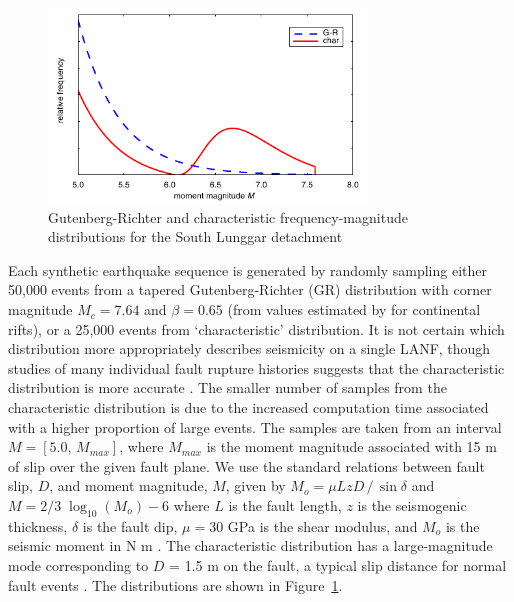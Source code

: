 \documentclass[twocolumn,grl]{AGUTeX}
\begin{document}
\begin{article}
\begin{figure}[b]
\noindent\includegraphics[width=20pc]{./figures/F-Ms.pdf}
\caption{Gutenberg-Richter and characteristic frequency-magnitude 
 		 distributions for the South Lunggar detachment}
\label{fig:fms}
\end{figure}

Each synthetic earthquake sequence is generated by
randomly sampling either 50,000 events from a tapered Gutenberg-Richter (GR)
distribution with corner magnitude $M_c = 7.64$ and $\beta = 0.65$
(from values estimated by \citet{birdkagan2004f_m} for continental
rifts), or a 25,000 events from `characteristic' distribution. It is not
certain which distribution more appropriately describes seismicity on a single
LANF, though studies of many individual fault rupture histories suggests
that the characteristic distribution is more accurate \citep{hecker2013eqdist}.
The smaller number of samples from the characteristic distribution is due to 
the increased computation time associated with a higher proportion of large 
events.  The samples are taken 
from an interval $M = [5.0, \, M_{max}]$, where $M_{max}$ is the
moment magnitude
associated with 15 m of slip over the given fault plane. We use the
standard relations between fault slip, $D$, and moment magnitude, $M$, given by
$M_o = \mu L z D \,/ \, \sin \delta$ and $M = 2/3 \; \log_{10} (M_o) - 6$
%
%
where $L$ is the fault length, $z$ is the seismogenic thickness, $\delta$ is the fault dip,
$\mu = 30$ GPa is the shear modulus, and $M_o$ is the seismic
moment in N m \citep{kagan2003pepi}.  The characteristic distribution has a
large-magnitude mode corresponding to $D$ = 1.5 m on the fault, a typical
slip distance for normal fault events \citep[e.g.][]{wesnousky2008displacement}.
The distributions are shown in Figure~\ref{fig:fms}.


\end{article}
\end{document}
